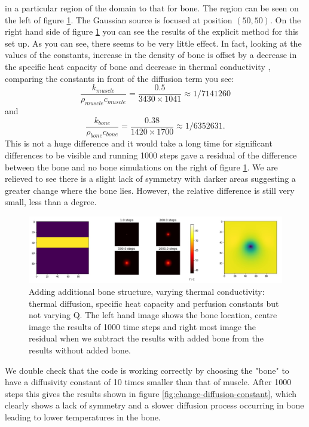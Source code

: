 \documentclass[11pt]{article} %
\begin{document}
in a particular region of the domain to that for bone. The region can be seen on the left of figure \ref{fig:bone-without-changing-q}. The Gaussian source is focused at position $(50,50)$. 
On the right hand side of figure \ref{fig:bone-without-changing-q} you can see the results of the explicit method for this set up. As you can see,  there seems to be very little effect. In fact, looking at the values of the constants,  increase in the density of bone is offset by a decrease in the specific heat capacity of bone and decrease in thermal conductivity , comparing the constants in front of the diffusion term you see:  \begin{equation}
\frac{k_{muscle}}{\rho_{muscle} c_{muscle}} = \frac{0.5}{3430 \times 1041} \approx 1/7141260 \label{apples}
\end{equation}  and \begin{equation}
\frac{k_{bone}}{\rho_{bone} c_{bone}} =\frac{0.38}{ 1420 \times 1700} \approx 1/ 6352631. \label{bananas}
\end{equation}This is not a huge difference and it would take a long time for significant differences to be visible and running 1000 steps gave a residual of the difference between the bone and no bone simulations on the right of figure \ref{fig:bone-without-changing-q}. We are relieved to see there is a slight lack of symmetry with darker areas suggesting a greater change where the bone lies. However, the relative difference is still very small, less than a degree.

\begin{figure}
	\centering
	\includegraphics[width=\linewidth]{"Report_images/bone without changing Q"}
	\caption{Adding additional bone structure, varying thermal conductivity: thermal diffusion, specific heat capacity and perfusion constants but not varying Q. The left hand image shows the bone location, centre image the results of 1000 time steps and right most image the residual when we subtract the results with added bone from the results without added bone.  }
	\label{fig:bone-without-changing-q}
\end{figure}

We double check that the code is working correctly by  choosing the "bone" to have a diffusivity constant of 10 times smaller than that of muscle. After 1000 steps this gives the results shown in figure \ref{fig:change-diffusion-constant}, which clearly shows a lack of symmetry and a slower diffusion process occurring in bone leading to lower temperatures in the bone. 
\end{document}
